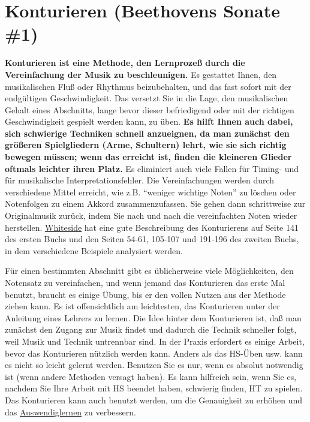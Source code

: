 
\section{Konturieren (Beethovens Sonate \#1)}\hypertarget{c1iii8}{} 

\textbf{Konturieren ist eine Methode, den Lernprozeß durch die Vereinfachung der Musik zu beschleunigen.}
Es gestattet Ihnen, den musikalischen Fluß oder Rhythmus beizubehalten, und das fast sofort mit der endgültigen Geschwindigkeit.
Das versetzt Sie in die Lage, den musikalischen Gehalt eines Abschnitts, lange bevor dieser befriedigend oder mit der richtigen Geschwindigkeit gespielt werden kann, zu üben.
\textbf{Es hilft Ihnen auch dabei, sich schwierige Techniken schnell anzueignen, da man zunächst den größeren Spielgliedern (Arme, Schultern) lehrt, wie sie sich richtig bewegen müssen; wenn das erreicht ist, finden die kleineren Glieder oftmals leichter ihren Platz.}
Es eliminiert auch viele Fallen für Timing- und für musikalische Interpretationsfehler.
Die Vereinfachungen werden durch verschiedene Mittel erreicht, wie z.B. \enquote{weniger wichtige Noten} zu löschen oder Notenfolgen zu einem Akkord zusammenzufassen.
Sie gehen dann schrittweise zur Originalmusik zurück, indem Sie nach und nach die vereinfachten Noten wieder herstellen.
\hyperlink{Whiteside}{Whiteside} hat eine gute Beschreibung des Konturierens auf Seite 141 des ersten Buchs und den Seiten 54-61, 105-107 und 191-196 des zweiten Buchs, in dem verschiedene Beispiele analysiert werden.

Für einen bestimmten Abschnitt gibt es üblicherweise viele Möglichkeiten, den Notensatz zu vereinfachen, und wenn jemand das Konturieren das erste Mal benutzt, braucht es einige Übung, bis er den vollen Nutzen aus der Methode ziehen kann.
Es ist offensichtlich am leichtesten, das Konturieren unter der Anleitung eines Lehrers zu lernen.
Die Idee hinter dem Konturieren ist, daß man zunächst den Zugang zur Musik findet und dadurch die Technik schneller folgt, weil Musik und Technik untrennbar sind.
In der Praxis erfordert es einige Arbeit, bevor das Konturieren nützlich werden kann.
Anders als das HS-Üben usw. kann es nicht so leicht gelernt werden.
Benutzen Sie es nur, wenn es absolut notwendig ist (wenn andere Methoden versagt haben).
Es kann hilfreich sein, wenn Sie es, nachdem Sie Ihre Arbeit mit HS beendet haben, schwierig finden, HT zu spielen.
Das Konturieren kann auch benutzt werden, um die Genauigkeit zu erhöhen und das \hyperlink{c1iii6}{Auswendiglernen} zu verbessern.

